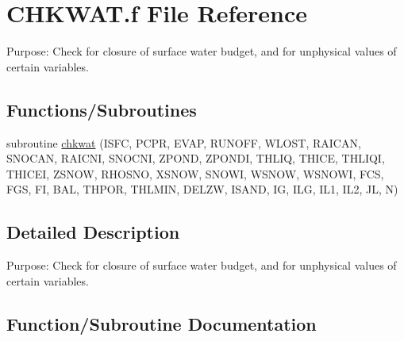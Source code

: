 \hypertarget{CHKWAT_8f}{}\section{C\+H\+K\+W\+A\+T.\+f File Reference}
\label{CHKWAT_8f}


Purpose\+: Check for closure of surface water budget, and for unphysical values of certain variables.  


\subsection*{Functions/\+Subroutines}
\begin{DoxyCompactItemize}
\item 
subroutine \hyperlink{CHKWAT_8f_ae24f10ada6d260b942e1b64c3dc5a310}{chkwat} (I\+S\+F\+C, P\+C\+P\+R, E\+V\+A\+P, R\+U\+N\+O\+F\+F, W\+L\+O\+S\+T, R\+A\+I\+C\+A\+N, S\+N\+O\+C\+A\+N, R\+A\+I\+C\+N\+I, S\+N\+O\+C\+N\+I, Z\+P\+O\+N\+D, Z\+P\+O\+N\+D\+I, T\+H\+L\+I\+Q, T\+H\+I\+C\+E, T\+H\+L\+I\+Q\+I, T\+H\+I\+C\+E\+I, Z\+S\+N\+O\+W, R\+H\+O\+S\+N\+O, X\+S\+N\+O\+W, S\+N\+O\+W\+I, W\+S\+N\+O\+W, W\+S\+N\+O\+W\+I, F\+C\+S, F\+G\+S, F\+I, B\+A\+L, T\+H\+P\+O\+R, T\+H\+L\+M\+I\+N, D\+E\+L\+Z\+W, I\+S\+A\+N\+D, I\+G, I\+L\+G, I\+L1, I\+L2, J\+L, N)
\end{DoxyCompactItemize}


\subsection{Detailed Description}
Purpose\+: Check for closure of surface water budget, and for unphysical values of certain variables. 



\subsection{Function/\+Subroutine Documentation}
\hypertarget{CHKWAT_8f_ae24f10ada6d260b942e1b64c3dc5a310}{}
